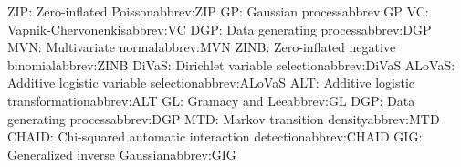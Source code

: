 \begin{tabbing}
\addabbrev ZIP: {\hspace{.4in}Zero-inflated Poisson}{abbrev:ZIP}
\addabbrev GP: {\hspace{.4in}Gaussian process}{abbrev:GP}
\addabbrev VC: {\hspace{.4in}Vapnik-Chervonenkis}{abbrev:VC}
\addabbrev DGP: {\hspace{.4in}Data generating process}{abbrev:DGP}
\addabbrev MVN: {\hspace{.4in}Multivariate normal}{abbrev:MVN}
\addabbrev ZINB: {\hspace{.4in}Zero-inflated negative binomial}{abbrev:ZINB}
\addabbrev DiVaS: {\hspace{.4in}Dirichlet variable selection}{abbrev:DiVaS}
\addabbrev ALoVaS: {\hspace{.4in}Additive logistic variable selection}{abbrev:ALoVaS}
\addabbrev ALT: {\hspace{.4in}Additive logistic transformation}{abbrev:ALT}
\addabbrev GL: {\hspace{.4in}Gramacy and Lee}{abbrev:GL}
\addabbrev DGP: {\hspace{.4in}Data generating process}{abbrev:DGP}
\addabbrev MTD: {\hspace{.4in}Markov transition density}{abbrev:MTD}
\addabbrev CHAID: {\hspace{.4in}Chi-squared automatic interaction detection}{abbrev:CHAID}
\addabbrev GIG: {\hspace{.4in}Generalized inverse Gaussian}{abbrev:GIG}



\end{tabbing}